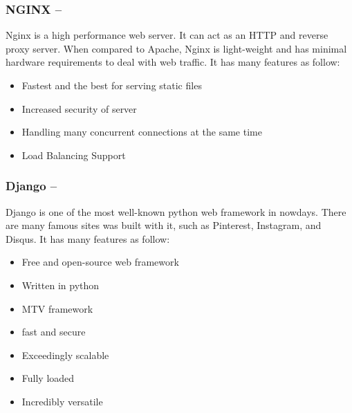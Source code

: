 \subsubsection*{NGINX  --  }

Nginx is a high performance web server. It can act as an HTTP and reverse proxy server. When compared to Apache, Nginx is light-weight and has minimal hardware requirements to deal with web traffic. It has many features as follow:
\begin{itemize}
	\item Fastest and the best for serving static files
	\item Increased security of server 
	\item Handling many concurrent connections at the same time
	\item Load Balancing Support
\end{itemize}
\subsubsection*{Django  --  }
Django is one of the most well-known python web framework in nowdays. There are many famous sites was built with it, such as Pinterest, Instagram, and Disqus. It has many features as follow:
\begin{itemize}
	\item Free and open-source web framework
	\item Written in python
	\item MTV framework
	\item fast and secure
	\item Exceedingly scalable
	\item Fully loaded
	\item Incredibly versatile
\end{itemize}


